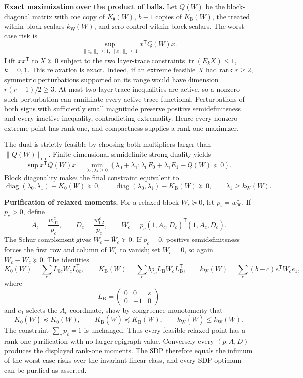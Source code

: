 \textbf{Exact maximization over the product of balls.}  Let \(Q(W)\) be the block-diagonal matrix with one copy of \(K_0(W)\), \(b-1\) copies of \(K_{\mathrm B}(W)\), the treated within-block scalars \(k_{\mathrm W}(W)\), and zero control within-block scalars.  The worst-case risk is
\[
\sup_{\|x_0\|_2\le1,\,\|x_1\|_2\le1}x^{\mathsf T}Q(W)x.
\]
Lift \(xx^{\mathsf T}\) to \(X\succeq0\) subject to the two layer-trace constraints \(\operatorname{tr}(E_kX)\le1\), \(k=0,1\).  This relaxation is exact.  Indeed, if an extreme feasible \(X\) had rank \(r\ge2\), symmetric perturbations supported on its range would have dimension \(r(r+1)/2\ge3\).  At most two layer-trace inequalities are active, so a nonzero such perturbation can annihilate every active trace functional.  Perturbations of both signs with sufficiently small magnitude preserve positive semidefiniteness and every inactive inequality, contradicting extremality.  Hence every nonzero extreme point has rank one, and compactness supplies a rank-one maximizer.

The dual is strictly feasible by choosing both multipliers larger than \(\|Q(W)\|_{\mathrm{op}}\).  Finite-dimensional semidefinite strong duality yields
\[
\sup x^{\mathsf T}Q(W)x
=\min_{\lambda_0,\lambda_1\ge0}
\left\{\lambda_0+\lambda_1:
\lambda_0E_0+\lambda_1E_1-Q(W)\succeq0\right\}.
\]
Block diagonality makes the final constraint equivalent to
\[
\operatorname{diag}(\lambda_0,\lambda_1)-K_0(W)\succeq0,
\qquad
\operatorname{diag}(\lambda_0,\lambda_1)-K_{\mathrm B}(W)\succeq0,
\qquad
\lambda_1\ge k_{\mathrm W}(W).
\]

\textbf{Purification of relaxed moments.}  For a relaxed block \(W_c\succeq0\), let \(p_c=w^c_{00}\).  If \(p_c>0\), define
\[
\bar A_c=\frac{w^c_{01}}{p_c},
\qquad
\bar D_c=\frac{w^c_{02}}{p_c},
\qquad
\bar W_c=p_c(1,\bar A_c,\bar D_c)^{\mathsf T}(1,\bar A_c,\bar D_c).
\]
The Schur complement gives \(W_c-\bar W_c\succeq0\).  If \(p_c=0\), positive semidefiniteness forces the first row and column of \(W_c\) to vanish; set \(\bar W_c=0\), so again \(W_c-\bar W_c\succeq0\).  The identities
\[
K_0(W)=\sum_cL_{0c}W_cL_{0c}^{\mathsf T},
\qquad
K_{\mathrm B}(W)=\sum_cb\rho_cL_{\mathrm B}W_cL_{\mathrm B}^{\mathsf T},
\qquad
k_{\mathrm W}(W)=\sum_c(b-c)e_1^{\mathsf T}W_ce_1,
\]
where
\[
L_{\mathrm B}=\begin{pmatrix}0&0&s\\0&-1&0\end{pmatrix}
\]
and \(e_1\) selects the \(A_c\)-coordinate, show by congruence monotonicity that
\[
K_0(\bar W)\preceq K_0(W),
\qquad
K_{\mathrm B}(\bar W)\preceq K_{\mathrm B}(W),
\qquad
k_{\mathrm W}(\bar W)\le k_{\mathrm W}(W).
\]
The constraint \(\sum_cp_c=1\) is unchanged.  Thus every feasible relaxed point has a rank-one purification with no larger epigraph value.  Conversely every \((p,A,D)\) produces the displayed rank-one moments.  The SDP therefore equals the infimum of the worst-case risks over the invariant linear class, and every SDP optimum can be purified as asserted.
